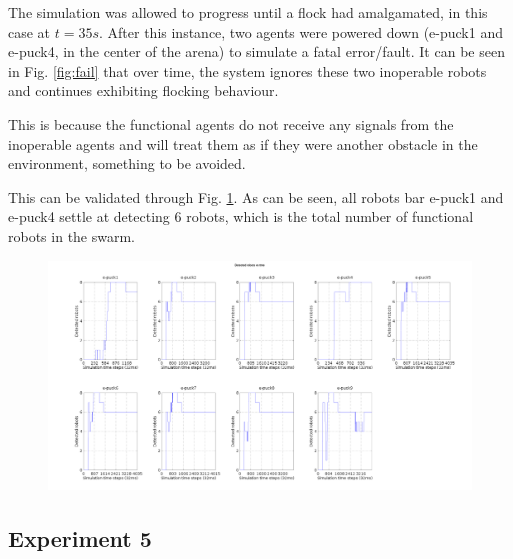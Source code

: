 The simulation was allowed to progress until a flock had amalgamated, in this case at \(t = 35s\). After this instance, two agents were powered down (e-puck1 and e-puck4, in the center of the arena) to simulate a fatal error/fault. It can be seen in Fig. \ref{fig:fail} that over time, the system ignores these two inoperable robots and continues exhibiting flocking behaviour. 

This is because the functional agents do not receive any signals from the inoperable agents and will treat them as if they were another obstacle in the environment, something to be avoided. 

This can be validated through Fig. \ref{fig:exp4}. As can be seen, all robots bar e-puck1 and e-puck4 settle at detecting 6 robots, which is the total number of functional robots in the swarm.

\begin{figure}
	\centering
	\begin{minipage}{1\textwidth}
		\centering
		\includegraphics[width=1\linewidth]{data-failure}
		\label{fig:exp4}
	\end{minipage}%
\end{figure}
\clearpage

\subsection{Experiment 5}

